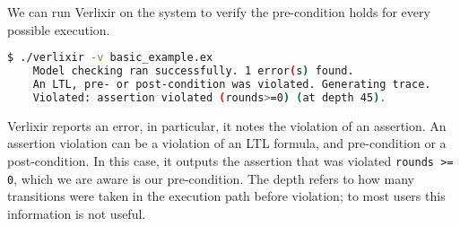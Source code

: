 We can run Verlixir on the system to verify the pre-condition holds for every possible execution.
\begin{lstlisting}[language=bash, xleftmargin=.1\linewidth]
    $ ./verlixir -v basic_example.ex
    Model checking ran successfully. 1 error(s) found.
    An LTL, pre- or post-condition was violated. Generating trace.
    Violated: assertion violated (rounds>=0) (at depth 45).
\end{lstlisting}
Verlixir reports an error, in particular, it notes the violation of an assertion. An assertion violation can be a violation of an LTL formula, and pre-condition or a post-condition. In this case, it outputs the assertion that was violated \texttt{rounds >= 0}, which we are aware is our pre-condition. The depth refers to how many transitions were taken in the execution path before violation; to most users this information is not useful.
